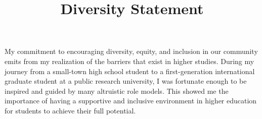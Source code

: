 \documentclass[10pt]{article}
\title{
\vspace{-3em}
\textbf{Diversity Statement} \hfill \href{https://ksolaiman.github.io/}{\textit{\Name}}
\vspace{-2.5em}
}
\date{}
\makeatletter
\def \paragraph {%
    \@startsection{paragraph}%
        {4}%
        \z@\z@{-\fontdimen 6 \font}%
        {\large \scshape \bfseries}%
    }
\makeatother
\begin{document}
\maketitle
\pagestyle{plain}

\noindent My commitment to encouraging diversity, equity, and inclusion in our community emits from my realization of the barriers that exist in higher studies.
During my journey from %
a small-town high school student to a first-generation international graduate student at a public research university, I was fortunate enough to be inspired and guided by many
altruistic %
role models.
This showed me the importance of having a supportive and inclusive environment in higher education 
for students to achieve their full potential. 
\end{document}
